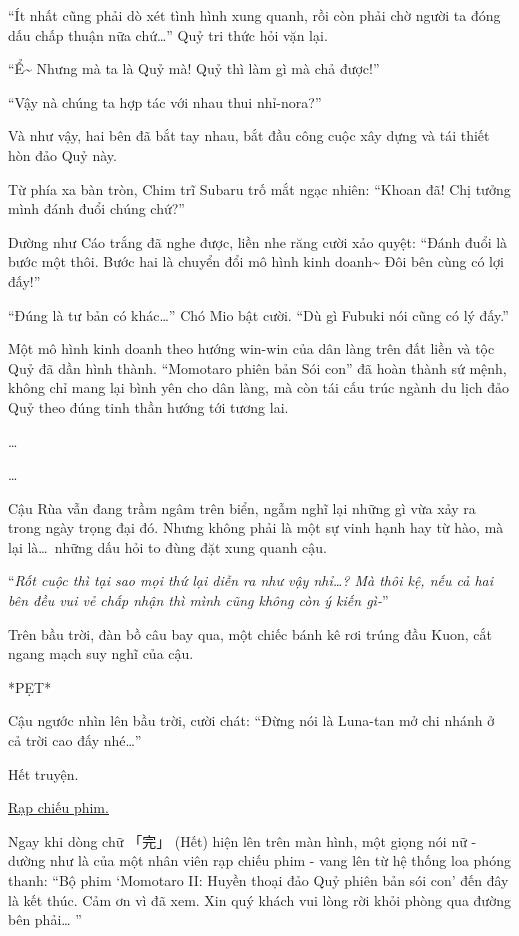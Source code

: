 \documentclass[../main.tex]{subfiles}
\begin{document}
``Ít nhất cũng phải dò xét tình hình xung quanh, rồi còn phải chờ người ta đóng dấu chấp thuận nữa chứ\dots'' Quỷ tri thức hỏi vặn lại.

``Ể\~{} Nhưng mà ta là Quỷ mà! Quỷ thì làm gì mà chả được!''

``Vậy nà chúng ta hợp tác với nhau thui nhỉ-nora?''

Và như vậy, hai bên đã bắt tay nhau, bắt đầu công cuộc xây dựng và tái thiết hòn đảo Quỷ này.

Từ phía xa bàn tròn, Chim trĩ Subaru trố mắt ngạc nhiên: ``Khoan đã! Chị tưởng mình đánh đuổi chúng chứ?''

Dường như Cáo trắng đã nghe được, liền nhe răng cười xảo quyệt: ``Đánh đuổi là bước một thôi. Bước hai là chuyển đổi mô hình kinh doanh\~{} Đôi bên cùng có lợi đấy!''

``Đúng là tư bản có khác\dots'' Chó Mio bật cười. ``Dù gì Fubuki nói cũng có lý đấy.''

Một mô hình kinh doanh theo hướng win-win của dân làng trên đất liền và tộc Quỷ đã dần hình thành. ``Momotaro phiên bản Sói con'' đã hoàn thành sứ mệnh, không chỉ mang lại bình yên cho dân làng, mà còn tái cấu trúc ngành du lịch đảo Quỷ theo đúng tinh thần hướng tới tương lai.

\dots

\dots

Cậu Rùa vẫn đang trầm ngâm trên biển, ngẫm nghĩ lại những gì vừa xảy ra trong ngày trọng đại đó. Nhưng không phải là một sự vinh hạnh hay từ hào, mà lại là\dots\ những dấu hỏi to đùng đặt xung quanh cậu.

``\textit{Rốt cuộc thì tại sao mọi thứ lại diễn ra như vậy nhỉ\dots? Mà thôi kệ, nếu cả hai bên đều vui vẻ chấp nhận thì mình cũng không còn ý kiến gì-}''

Trên bầu trời, đàn bồ câu bay qua, một chiếc bánh kê rơi trúng đầu Kuon, cắt ngang mạch suy nghĩ của cậu.

*PẸT*

Cậu ngước nhìn lên bầu trời, cười chát: ``Đừng nói là Luna-tan mở chi nhánh ở cả trời cao đấy nhé\dots''

Hết truyện.
\omk

\begin{center}
  \uline{Rạp chiếu phim.}
\end{center}

Ngay khi dòng chữ 「完」 (Hết) hiện lên trên màn hình, một giọng nói nữ - dường như là của một nhân viên rạp chiếu phim - vang lên từ hệ thống loa phóng thanh: ``Bộ phim `Momotaro II: Huyền thoại đảo Quỷ phiên bản sói con' đến đây là kết thúc. Cảm ơn vì đã xem. Xin quý khách vui lòng rời khỏi phòng qua đường bên phải\dots
''
\end{document}

